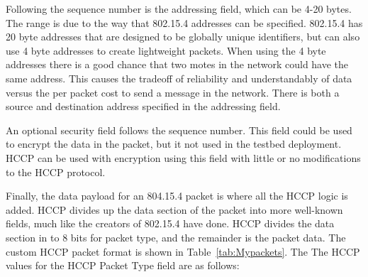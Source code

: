 Following the sequence number is the addressing field, which can be 4-20 bytes. The range is due to the 
way that 802.15.4 addresses can be specified. 802.15.4 has 20 byte addresses that are designed to be globally unique identifiers,
but can also use 4 byte addresses to create lightweight packets. When using the 4 byte addresses there is a good chance that 
two motes in the network could have the same address. This causes the tradeoff of reliability and understandably of data versus
the per packet cost to send a message in the network. There is both a source and destination address specified in the addressing field.

An optional security field follows the sequence number. This field could be used to encrypt the data in the packet,
but it not used in the testbed deployment. HCCP can be used with encryption using this field with little or no modifications
to the HCCP protocol.

Finally, the data payload for an 804.15.4 packet is where all the HCCP logic is added. HCCP divides up the 
data section of the packet into more well-known fields, much like the creators of 802.15.4 have done. 
HCCP divides the data section in to 8 bits for packet type, and the remainder is the packet data.
The custom HCCP packet format is shown in Table~\ref{tab:Mypackets}.  The
The HCCP values for the HCCP Packet Type field are as follows:

